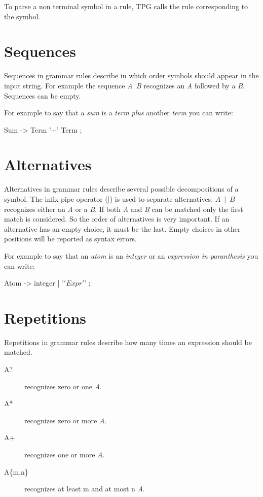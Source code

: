 To parse a non terminal symbol in a rule, TPG calls the rule corresponding to the symbol.

\section{Sequences}                                             \label{parser:sequences}

Sequences in grammar rules describe in which order symbols should appear in the input string.
For example the sequence \emph{A~B} recognizes an \emph{A} followed by a \emph{B}.
Sequences can be empty.

For example to say that a \emph{sum} is a \emph{term} \emph{plus} another \emph{term} you can write:
\begin{verbatimtab}[4]
    Sum -> Term '+' Term ;
\end{verbatimtab}

\section{Alternatives}                                          \label{parser:alternatives}

Alternatives in grammar rules describe several possible decompositions of a symbol.
The infix pipe operator (\emph{$\mid$}) is used to separate alternatives.
\emph{$A~\mid~B$} recognizes either an \emph{A} or a \emph{B}.
If both \emph{A} and \emph{B} can be matched only the first match is considered.
So the order of alternatives is very important.
If an alternative has an empty choice, it must be the last.
Empty choices in other positions will be reported as syntax errors.

For example to say that an \emph{atom} is an \emph{integer} or an \emph{expression in paranthesis}
you can write:
\begin{verbatimtab}[4]
    Atom -> integer | '\(' Expr '\)' ;
\end{verbatimtab}

\section{Repetitions}                                           \label{parser:repetitions}

Repetitions in grammar rules describe how many times an expression should be matched.

\begin{description}
    \item [A?] recognizes zero or one \emph{A}.
    \item [A*] recognizes zero or more \emph{A}.
    \item [A+] recognizes one or more \emph{A}.
    \item [A\{m,n\}] recognizes at least m and at most n \emph{A}.
\end{description}

